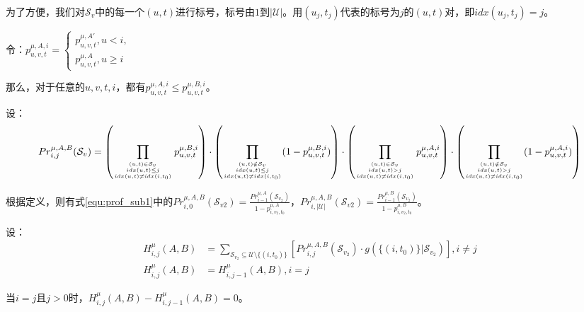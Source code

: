 为了方便，我们对$\mathcal{S}_v$中的每一个$(u,t)$进行标号，标号由$1$到$|\mathcal{U}|。$用$(u_j,t_j)$代表的标号为$j$的$(u,t)$对，即$idx(u_j,t_j)=j$。

令：$p_{u,v,t}^{\mu,A,i}=\begin{cases}p_{u,v,t}^{\mu,A'}, u<i,\\p_{u,v,t}^{\mu,A},u\ge i \end{cases}$

那么，对于任意的$u,v,t,i$，都有$p_{u,v,t}^{\mu,A,i} \le p_{u,v,t}^{\mu,B,i}$。

设：
\begin{equation}
\footnotesize
    Pr_{i,j}^{\mu,A,B}(\mathcal{S}_v)=\left(\prod_{{(u,t)\in \mathcal{S}_v \atop idx(u,t)\le j } \atop{ idx(u,t) \ne idx(i,t_0)}}p_{u,v,t}^{\mu,B,i}\right)\cdot \left(\prod_{{(u,t) \notin \mathcal{S}_v \atop idx(u,t)\le j} \atop{ idx(u,t) \ne idx(i,t_0)}} (1-p_{u,v,t}^{\mu,B,i})\right)
    \cdot \left(\prod_{{(u,t)\in \mathcal{S}_v \atop idx(u,t)> j} \atop {idx(u,t)\ne idx(i,t_0)}}p_{u,v,t}^{\mu,A,i}\right)\cdot \left(\prod_{{(u,t) \notin \mathcal{S}_v \atop idx(u,t)> j} \atop{ idx(u,t)\ne idx(i,t_0)}} (1-p_{u,v,t}^{\mu,A,i})\right)
\end{equation}

根据定义，则有式\ref{equ:prof_sub1}中的$Pr_{i,0}^{\mu,A,B}(\mathcal{S}_{v2})=\frac{Pr_{i-1}^{\mu,A}(\mathcal{S}_{v_2})}{1-p_{i,v_2,t_0}^{\mu,A}}$，$Pr_{i,|\mathcal{U}|}^{\mu,A,B}(\mathcal{S}_{v2})=\frac{Pr_{i-1}^{\mu,B}(\mathcal{S}_{v_2})}{1-p_{i,v_2,t_0}^{\mu,B}}$。

设：
\begin{align}
    H_{i,j}^{\mu}(A,B)&= \sum_{\mathcal{S}_{v_2}\subseteq \mathcal{U} \setminus \{(i,t_0)\}}\left[Pr_{i,j}^{\mu,A,B}(\mathcal{S}_{v_2}) \cdot g(\{(i,t_0)\} |\mathcal{S}_{v_2})\right],i\ne j 
    \\H_{i,j}^{\mu}(A,B)&=H_{i,j-1}^{\mu}(A,B),i=j
\end{align}

当$i=j$且$j>0$时，$H_{i,j}^{\mu}(A,B)-H_{i,j-1}^{\mu}(A,B)=0$。

